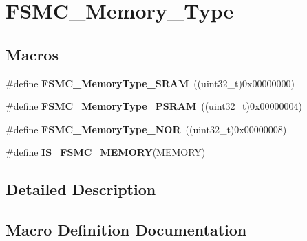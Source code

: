 \hypertarget{group___f_s_m_c___memory___type}{}\section{F\+S\+M\+C\+\_\+\+Memory\+\_\+\+Type}
\label{group___f_s_m_c___memory___type}
\subsection*{Macros}
\begin{DoxyCompactItemize}
\item 
\hypertarget{group___f_s_m_c___memory___type_ga8a24e8da42e67dcf6fb2f43659aa49cf}{}\#define {\bfseries F\+S\+M\+C\+\_\+\+Memory\+Type\+\_\+\+S\+R\+A\+M}~((uint32\+\_\+t)0x00000000)\label{group___f_s_m_c___memory___type_ga8a24e8da42e67dcf6fb2f43659aa49cf}

\item 
\hypertarget{group___f_s_m_c___memory___type_gae3e680998b2fee8d56222634f5268a75}{}\#define {\bfseries F\+S\+M\+C\+\_\+\+Memory\+Type\+\_\+\+P\+S\+R\+A\+M}~((uint32\+\_\+t)0x00000004)\label{group___f_s_m_c___memory___type_gae3e680998b2fee8d56222634f5268a75}

\item 
\hypertarget{group___f_s_m_c___memory___type_ga8b9390abe7c281947c550bf4365649e5}{}\#define {\bfseries F\+S\+M\+C\+\_\+\+Memory\+Type\+\_\+\+N\+O\+R}~((uint32\+\_\+t)0x00000008)\label{group___f_s_m_c___memory___type_ga8b9390abe7c281947c550bf4365649e5}

\item 
\#define {\bfseries I\+S\+\_\+\+F\+S\+M\+C\+\_\+\+M\+E\+M\+O\+R\+Y}(M\+E\+M\+O\+R\+Y)
\end{DoxyCompactItemize}


\subsection{Detailed Description}


\subsection{Macro Definition Documentation}
\hypertarget{group___f_s_m_c___memory___type_ga255cd500e141f4ac024cf5f896921233}{}
